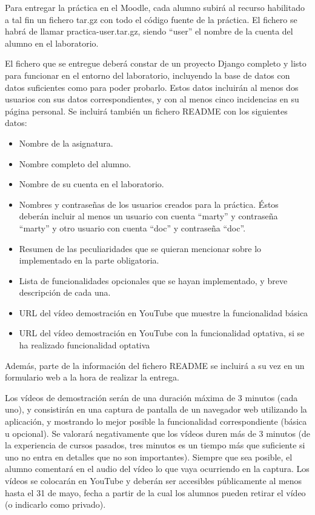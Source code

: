 Para entregar la práctica en el Moodle, cada alumno subirá al recurso habilitado a tal fin un fichero tar.gz con todo el código fuente de la práctica. El fichero se habrá de llamar practica-user.tar.gz, siendo ``user'' el nombre de la cuenta del alumno en el laboratorio.

El fichero que se entregue deberá constar de un proyecto Django completo y listo para funcionar en el entorno del laboratorio, incluyendo la base de datos con datos suficientes como para poder probarlo. Estos datos incluirán al menos dos usuarios con sus datos correspondientes, y con al menos cinco incidencias en su página personal. Se incluirá también un fichero README con los siguientes datos:

\begin{itemize}
  \item Nombre de la asignatura.
  \item Nombre completo del alumno.
  \item Nombre de su cuenta en el laboratorio.
  \item Nombres y contraseñas de los usuarios creados para la práctica. Éstos deberán incluir al menos un usuario con cuenta ``marty'' y contraseña ``marty'' y otro usuario con cuenta ``doc'' y contraseña ``doc''.
\item Resumen de las peculiaridades que se quieran mencionar sobre lo implementado en la parte obligatoria.
\item Lista de funcionalidades opcionales que se hayan implementado, y breve descripción de cada una.
\item URL del vídeo demostración en YouTube que muestre la funcionalidad básica
\item URL del vídeo demostración en YouTube con la funcionalidad optativa, si se ha realizado funcionalidad optativa
\end{itemize}

Además, parte de la información del fichero README se incluirá a su vez en un formulario web a la hora de realizar la entrega.

Los vídeos de demostración serán de una duración máxima de 3 minutos (cada uno), y consistirán en una captura de pantalla de un navegador web utilizando la aplicación, y mostrando lo mejor posible la funcionalidad correspondiente (básica u opcional). Se valorará negativamente que los vídeos duren más de 3 minutos (de la experiencia de cursos pasados, tres minutos es un tiempo más que suficiente si uno no entra en detalles que no son importantes). Siempre que sea posible, el alumno comentará en el audio del vídeo lo que vaya ocurriendo en la captura. Los vídeos se colocarán en YouTube y deberán ser accesibles públicamente al menos hasta el 31 de mayo, fecha a partir de la cual los alumnos pueden retirar el vídeo (o indicarlo como privado).

